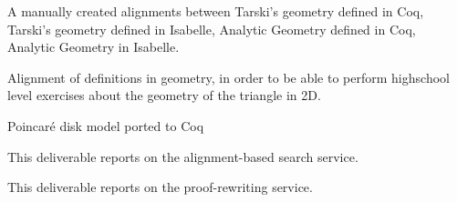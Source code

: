 \begin{workpackage}
\begin{wpdelivs}
\begin{wpdeliv}[due=3,miles=startup,id=aligningconstructiveanalysisminilog,dissem=PU,nature=DEM,lead=Lmu]
  \end{wpdeliv}
  \begin{wpdeliv}[due=3,miles=startup,id=aligninggeometries,dissem=PU,nature=DEM,lead=Bel]
    {A manually created alignments between Tarski's geometry defined
      in Coq, Tarski's geometry defined in Isabelle, Analytic Geometry
      defined in Coq, Analytic Geometry in Isabelle.}
  \end{wpdeliv}
  \begin{wpdeliv}[due=3,miles=startup,id=aligninggeometrieshighschool,dissem=PU,nature=DEM,lead=Str]
    {Alignment of definitions in geometry, in order to be able to
      perform highschool level exercises about the geometry of the
      triangle in 2D.}
  \end{wpdeliv}
  \begin{wpdeliv}[due=3,miles=startup,id=aligningpoincare,dissem=PU,nature=DEM,lead=Bel]
    {Poincar\'e disk model ported to Coq}
  \end{wpdeliv}
	\begin{wpdeliv}[due=36,miles=???,id=alignsearch,dissem=PU,nature=DEM,lead=Fau]
	This deliverable reports on the alignment-based search service.
	\end{wpdeliv}
	
	\begin{wpdeliv}[due=36,miles=???,id=alignproofrewr,dissem=PU,nature=DEM,lead=Bol]
	This deliverable reports on the proof-rewriting service.
	\end{wpdeliv}

\end{wpdelivs}
\end{workpackage}

